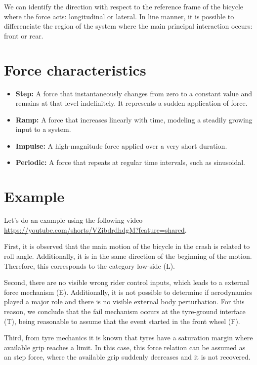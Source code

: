\documentclass{article}
\begin{document}
We can identify the direction with respect to the reference frame of the bicycle where the force acts: longitudinal or lateral.
%
In line manner, it is possible to differenciate the region of the system where the main principal interaction occurs: front or rear.

\section{Force characteristics}


\begin{itemize}
    \item \textbf{Step:} A force that instantaneously changes from zero to a constant value and remains at that level indefinitely. It represents a sudden application of force.
    \item \textbf{Ramp:} A force that increases linearly with time, modeling a steadily growing input to a system.
    \item \textbf{Impulse:} A high-magnitude force applied over a very short duration.
    \item \textbf{Periodic:} A force that repeats at regular time intervals, such as sinusoidal.
\end{itemize}


\section{Example}

Let's do an example using the following video \url{https://youtube.com/shorts/VZibdrdhdgM?feature=shared}.

First, it is observed that the main motion of the bicycle in the crash is related to roll angle.
%
Additionally, it is in the same direction of the beginning of the motion.
%
Therefore, this corresponds to the category low-side (L).


Second, there are no visible wrong rider control inputs, which leads to a external force mechanism (E).
%
Additionally, it is not possible to determine if aerodynamics played a major role and there is no visible external body perturbation.
%
For this reason, we conclude that the fail mechanism occurs at the tyre-ground interface (T), being reasonable to assume that the event started in the front wheel (F).


Third, from tyre mechanics it is known that tyres have a saturation margin where available grip reaches a limit.
%
In this case, this force relation can be assumed as an step force, where the available grip suddenly decreases and it is not recovered.
\end{document}
